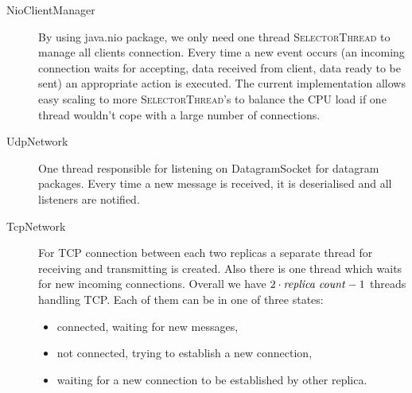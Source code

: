 \begin{description}
	\item[NioClientManager] \hfill

		By using java.nio package, we only need one thread \textsc{SelectorThread} to manage all clients connection. Every time a new event occurs (an incoming connection waits for accepting, data received from client, data ready to be sent) an appropriate action is executed. The current implementation allows easy scaling %
                to more \textsc{SelectorThread}'s to balance the CPU load if one thread wouldn't cope with a large number of connections.

	\item[UdpNetwork] \hfill

		One thread responsible for listening on DatagramSocket for datagram packages. Every time a new message is received, it is deserialised and all listeners are notified. 

	\item[TcpNetwork] \hfill

		For TCP connection between each two replicas a separate thread for receiving and transmitting is created. Also there is one thread which waits for new incoming connections. Overall we have  $2 \cdot \text{\textit{replica count}} - 1$ %
                threads handling TCP. Each of them can be in one of three states:
		\begin{itemize}
			\item connected, waiting for new messages,
			\item not connected, trying to establish a new connection,
			\item waiting for a new connection to be established by other replica.
		\end{itemize}
\end{description}
